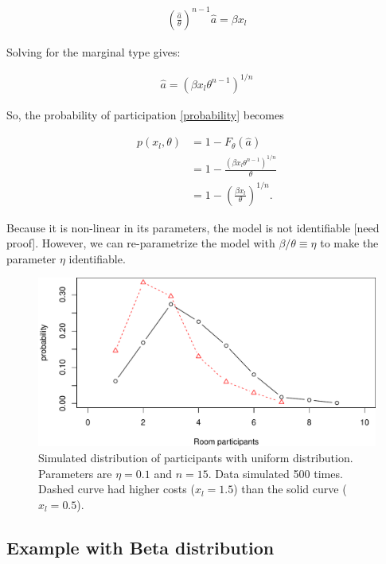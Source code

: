 \documentclass[]{article}
\theoremstyle{plain} %
\newcommand\mtype{\hat{a}}
\begin{document}
\begin{align}
    \left(\frac{\mtype}{\theta}\right)^{n-1} \mtype = \beta x_l 
\end{align}

Solving for the marginal type gives:

\begin{align}
    \mtype = \left(\beta x_l  \theta^{n-1}\right)^{1/n}
\end{align}

So, the probability of participation \eqref{probability} becomes

\begin{align}
    p(x_l, \theta) 
        & = 1 - F_\theta(\mtype) \\
        & = 1 - \frac{\left(\beta x_l \theta^{n-1}\right)^{1/n} }{\theta} \\
        & = 1 - \left(\frac{\beta x_l}{\theta}\right)^{1/n}.
\end{align}

Because it is non-linear in its parameters, the model is not
identifiable {[}need proof{]}. However, we can re-parametrize the model
with \(\beta/\theta \equiv \eta\) to make the parameter \(\eta\)
identifiable.

\begin{figure}
\centering
\includegraphics{report_notes_files/figure-latex/unnamed-chunk-2-1.pdf}
\caption{Simulated distribution of participants with uniform
distribution. Parameters are \(\eta=0.1\) and \(n=15\). Data simulated
500 times. Dashed curve had higher costs (\(x_l=1.5\)) than the solid
curve (\(x_l=0.5\)).}
\end{figure}

\subsection{Example with Beta
distribution}\label{example-with-beta-distribution}
\end{document}
